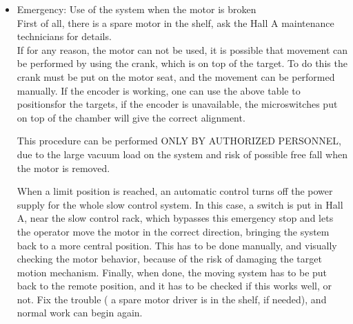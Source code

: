 {\begin{itemize}
\item Emergency: Use of the system when the motor is broken \\
First of all, there is a spare motor in the shelf, ask the Hall A
maintenance technicians for details. \\
If for any reason, the motor can not be used, it is possible that
movement can be performed by using the crank, which is on top of the
target. To do this the crank must be put on the motor seat, and the
movement can be performed manually. If the encoder is working, one
can use the above table to positionsfor the targets, if the encoder
is unavailable, the microswitches put on top of the chamber will give
the correct alignment. \\
\begin{safetyen}{10}{10}
This procedure can be performed ONLY BY AUTHORIZED PERSONNEL, due
to the large vacuum load on the system and risk of possible free fall
when the motor is removed.
\end{safetyen}
When a limit position is reached, an automatic control turns off the
power supply for the whole slow control system. In this case, a switch
is put in Hall A, near the slow control rack, which bypasses this
emergency stop and lets the operator move the motor in the correct
direction, bringing the system back to a more central position. This
has to be done manually, and visually checking the motor behavior,
because of the risk of damaging the target motion mechanism. Finally,
when done, the moving system has to be put back to the remote position,
and it has to be checked if this works well, or not. Fix the trouble
( a spare motor driver is in the shelf, if needed), and normal work
can begin again.
\end{itemize}

}

